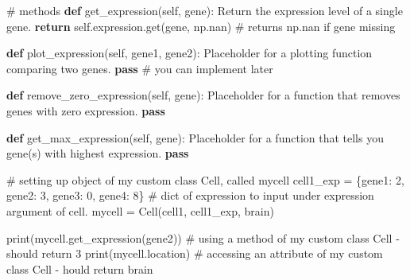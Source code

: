 \documentclass[
  letterpaper,
  DIV=11,
  numbers=noendperiod]{scrartcl}
\newenvironment{Shaded}{\begin{snugshade}}{\end{snugshade}}
\newcommand{\BuiltInTok}[1]{\textcolor[rgb]{0.00,0.23,0.31}{#1}}
\newcommand{\CommentTok}[1]{\textcolor[rgb]{0.37,0.37,0.37}{#1}}
\newcommand{\ControlFlowTok}[1]{\textcolor[rgb]{0.00,0.23,0.31}{\textbf{#1}}}
\newcommand{\DecValTok}[1]{\textcolor[rgb]{0.68,0.00,0.00}{#1}}
\newcommand{\KeywordTok}[1]{\textcolor[rgb]{0.00,0.23,0.31}{\textbf{#1}}}
\newcommand{\NormalTok}[1]{\textcolor[rgb]{0.00,0.23,0.31}{#1}}
\newcommand{\OperatorTok}[1]{\textcolor[rgb]{0.37,0.37,0.37}{#1}}
\newcommand{\StringTok}[1]{\textcolor[rgb]{0.13,0.47,0.30}{#1}}
\newcommand{\VariableTok}[1]{\textcolor[rgb]{0.07,0.07,0.07}{#1}}
\begin{document}
\begin{Shaded}
\begin{Highlighting}[]
    \CommentTok{\# methods}
    \KeywordTok{def}\NormalTok{ get\_expression(}\VariableTok{self}\NormalTok{, gene):}
        \CommentTok{\textquotesingle{}\textquotesingle{}\textquotesingle{}Return the expression level of a single gene.\textquotesingle{}\textquotesingle{}\textquotesingle{}}
        \ControlFlowTok{return} \VariableTok{self}\NormalTok{.expression.get(gene, np.nan)  }\CommentTok{\# returns np.nan if gene missing}

    \KeywordTok{def}\NormalTok{ plot\_expression(}\VariableTok{self}\NormalTok{, gene1, gene2):}
        \CommentTok{\textquotesingle{}\textquotesingle{}\textquotesingle{}Placeholder for a plotting function comparing two genes.\textquotesingle{}\textquotesingle{}\textquotesingle{}}
        \ControlFlowTok{pass}  \CommentTok{\# you can implement later}

    \KeywordTok{def}\NormalTok{ remove\_zero\_expression(}\VariableTok{self}\NormalTok{, gene):}
        \CommentTok{\textquotesingle{}\textquotesingle{}\textquotesingle{}Placeholder for a function that removes genes with zero expression.\textquotesingle{}\textquotesingle{}\textquotesingle{}}
        \ControlFlowTok{pass}

    \KeywordTok{def}\NormalTok{ get\_max\_expression(}\VariableTok{self}\NormalTok{, gene):}
        \CommentTok{\textquotesingle{}\textquotesingle{}\textquotesingle{}Placeholder for a function that tells you gene(s) with highest expression.\textquotesingle{}\textquotesingle{}\textquotesingle{}}
        \ControlFlowTok{pass}


\CommentTok{\# setting up object of my custom class Cell, called mycell}
\NormalTok{cell1\_exp }\OperatorTok{=}\NormalTok{ \{}\StringTok{\textquotesingle{}gene1\textquotesingle{}}\NormalTok{: }\DecValTok{2}\NormalTok{, }\StringTok{\textquotesingle{}gene2\textquotesingle{}}\NormalTok{: }\DecValTok{3}\NormalTok{, }\StringTok{\textquotesingle{}gene3\textquotesingle{}}\NormalTok{: }\DecValTok{0}\NormalTok{, }\StringTok{\textquotesingle{}gene4\textquotesingle{}}\NormalTok{: }\DecValTok{8}\NormalTok{\} }\CommentTok{\# dict of expression to input under expression argument of cell.}
\NormalTok{mycell }\OperatorTok{=}\NormalTok{ Cell(}\StringTok{\textquotesingle{}cell1\textquotesingle{}}\NormalTok{, cell1\_exp, }\StringTok{\textquotesingle{}brain\textquotesingle{}}\NormalTok{)}


\BuiltInTok{print}\NormalTok{(mycell.get\_expression(}\StringTok{\textquotesingle{}gene2\textquotesingle{}}\NormalTok{))  }\CommentTok{\# using a method of my custom class Cell {-} should return 3}
\BuiltInTok{print}\NormalTok{(mycell.location)  }\CommentTok{\# accessing an attribute of my custom class Cell {-} hould return brain}
\end{Highlighting}
\end{Shaded}
\end{document}
